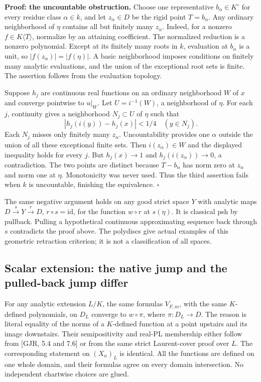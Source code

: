 \documentclass[
  11pt,
]{article}
\begin{document}
\textbf{Proof: the uncountable obstruction.} Choose one representative
\(b_\alpha\in K^\circ\) for every residue class \(\alpha\in k\), and let
\(z_\alpha\in D\) be the rigid point \(T=b_\alpha\). Any ordinary
neighborhood of \(\eta\) contains all but finitely many \(z_\alpha\).
Indeed, for a nonzero \(f\in K\langle T\rangle\), normalize by an
attaining coefficient. The normalized reduction is a nonzero polynomial.
Except at its finitely many roots in \(k\), evaluation at \(b_\alpha\)
is a unit, so \(|f(z_\alpha)|=|f(\eta)|\). A basic neighborhood imposes
conditions on finitely many analytic evaluations, and the union of the
exceptional root sets is finite. The assertion follows from the
evaluation topology.

Suppose \(h_j\) are continuous real functions on an ordinary
neighborhood \(W\) of \(x\) and converge pointwise to \(u|_W\). Let
\(U=i^{-1}(W)\), a neighborhood of \(\eta\). For each \(j\), continuity
gives a neighborhood \(N_j\subset U\) of \(\eta\) such that
\[|h_j(i(y))-h_j(x)|<1/4\quad(y\in N_j).\] Each \(N_j\) misses only
finitely many \(z_\alpha\). Uncountability provides one \(\alpha\)
outside the union of all these exceptional finite sets. Then
\(i(z_\alpha)\in W\) and the displayed inequality holds for every \(j\).
But \(h_j(x)\to1\) and \(h_j(i(z_\alpha))\to0\), a contradiction. The
two points are distinct because \(T-b_\alpha\) has norm zero at
\(z_\alpha\) and norm one at \(\eta\). Monotonicity was never used. Thus
the third assertion fails when \(k\) is uncountable, finishing the
equivalence. \(\square\)

The same negative argument holds on any good strict space \(Y\) with
analytic maps \(D\xrightarrow{s}Y\xrightarrow{r}D\),
\(r\circ s=\mathrm{id}\), for the function \(w\circ r\) at \(s(\eta)\).
It is classical psh by pullback. Pulling a hypothetical continuous
approximating sequence back through \(s\) contradicts the proof above.
The polydiscs give actual examples of this geometric retraction
criterion; it is not a classification of all spaces.

\subsection{Scalar extension: the native jump and the pulled-back jump
differ}\label{scalar-extension-the-native-jump-and-the-pulled-back-jump-differ}

For any analytic extension \(L/K\), the same formulas \(V_{F,m}\), with
the same \(K\)-defined polynomials, on \(D_L\) converge to
\(w\circ\pi\), where \(\pi:D_L\to D\). The reason is literal equality of
the norms of a \(K\)-defined function at a point upstairs and its image
downstairs. Their semipositivity and real-PL membership either follow
from {[}GJR, 5.4 and 7.6{]} or from the same strict Laurent-cover proof
over \(L\). The corresponding statement on \((X_n)_L\) is identical. All
the functions are defined on one whole domain, and their formulas agree
on every domain intersection. No independent chartwise choices are
glued.
\end{document}
